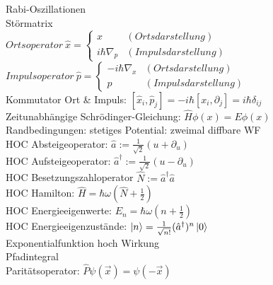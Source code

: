 \documentclass{article}
\begin{document}
Rabi-Oszillationen \\

St\"ormatrix \\

$Ortsoperator\ \hat{x}=\left\{\begin{array}{ll} 
x & (Ortsdarstellung) \\
i \hbar \nabla_p & (Impulsdarstellung)
\end{array}\right.$ \\

$Impulsoperator\ \hat{p}=\left\{\begin{array}{ll}  
- i \hbar \nabla_x & (Ortsdarstellung) \\
p & (Impulsdarstellung)
\end{array}\right.$ \\

Kommutator Ort \& Impuls: $[ \hat{x}_i, \hat{p}_j] = - i \hbar \left[x_i, \partial_j\right] = i \hbar \delta_{ij}$ \\

Zeitunabh\"angige Schr\"odinger-Gleichung: $\hat{H}\phi(x) = E \phi(x)$ \\

Randbedingungen: stetiges Potential: zweimal diffbare WF \\

HOC Absteigeoperator: $\hat{a} := \frac{1}{\sqrt{2}} (u + \partial_u)$ \\

HOC Aufsteigeoperator: $\hat{a}^{\dagger} := \frac{1}{\sqrt{2}} (u - \partial_u)$ \\

HOC Besetzungszahloperator $\hat{N} := \hat{a}^{\dagger} \hat{a} $ \\

HOC Hamilton: $ \hat{H} = \hbar \omega \left( \hat{N} + \frac{1}{2} \right) $ \\

HOC Energieeigenwerte: $ E_n = \hbar \omega \left( n + \frac{1}{2} \right)$\\

HOC Energieeigenzust\"ande: $\ket{n} = \frac{1}{\sqrt{n!}}(\hat{a}^{\dagger})^n \ket{0}$ \\

Exponentialfunktion hoch Wirkung \\

Pfadintegral \\

Parit\"atsoperator: $\hat{P}\psi(\vec{x}) = \psi(-\vec{x}) $ \\
\end{document}
